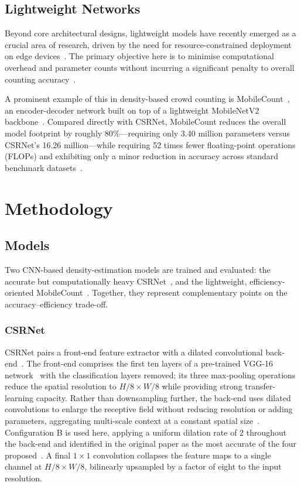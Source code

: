 \documentclass[conference]{IEEEtran}
\begin{document}
\subsection{Lightweight Networks}
Beyond core architectural designs, lightweight models have recently emerged as a crucial area of research, driven by the need for resource-constrained deployment on edge devices~\cite{wang2020mobilecount}. The primary objective here is to minimise computational overhead and parameter counts without incurring a significant penalty to overall counting accuracy~\cite{gao2020crowdcountingsurvey, wang2020mobilecount}.

A prominent example of this in density-based crowd counting is MobileCount~\cite{wang2020mobilecount}, an encoder-decoder network built on top of a lightweight MobileNetV2 backbone~\cite{sandler2018mobilenetv2}. Compared directly with CSRNet, MobileCount reduces the overall model footprint by roughly 80\%---requiring only 3.40 million parameters versus CSRNet's 16.26 million---while requiring 52 times fewer floating-point operations (FLOPs) and exhibiting only a minor reduction in accuracy across standard benchmark datasets~\cite{wang2020mobilecount}.

\section{Methodology}
\subsection{Models}

Two CNN-based density-estimation models are trained and evaluated: the accurate but computationally heavy CSRNet~\cite{li2018csrnet}, and the lightweight, efficiency-oriented MobileCount~\cite{wang2020mobilecount}. Together, they represent complementary points on the accuracy--efficiency trade-off.

\subsubsection{CSRNet}
CSRNet pairs a front-end feature extractor with a dilated convolutional back-end~\cite{yu2016multiscale, li2018csrnet}. The front-end comprises the first ten layers of a pre-trained VGG-16 network~\cite{simonyan2015vgg} with the classification layers removed; its three max-pooling operations reduce the spatial resolution to $H/8 \times W/8$ while providing strong transfer-learning capacity. Rather than downsampling further, the back-end uses dilated convolutions to enlarge the receptive field without reducing resolution or adding parameters, aggregating multi-scale context at a constant spatial size~\cite{yu2016multiscale, li2018csrnet}. Configuration B is used here, applying a uniform dilation rate of 2 throughout the back-end and identified in the original paper as the most accurate of the four proposed~\cite{li2018csrnet}. A final $1 \times 1$ convolution collapses the feature maps to a single channel at $H/8 \times W/8$, bilinearly upsampled by a factor of eight to the input resolution.
\end{document}
